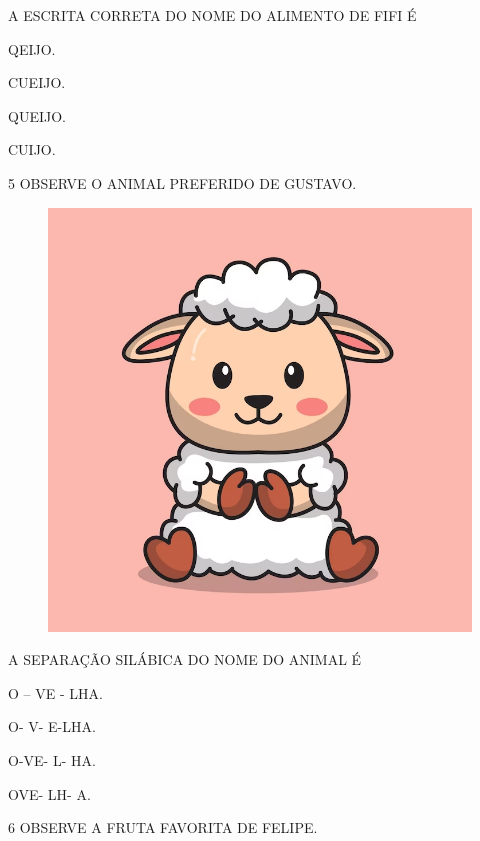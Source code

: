 A ESCRITA CORRETA DO NOME DO ALIMENTO DE FIFI É

\begin{multicols}{2}
\begin{escolha}

\item QEIJO.

\item CUEIJO.

\item QUEIJO.

\item CUIJO.
\end{escolha}
\end{multicols}

\num{5} OBSERVE O ANIMAL PREFERIDO DE GUSTAVO.

\begin{figure}[H]
\centering
\includegraphics[width=.5\textwidth]{./media/image214.png}
\end{figure}

A SEPARAÇÃO SILÁBICA DO NOME DO ANIMAL É

\begin{escolha}

\item O – VE - LHA.

\item O- V- E-LHA.

\item O-VE- L- HA.

\item OVE- LH- A.

\end{escolha}

\num{6} OBSERVE A FRUTA FAVORITA DE FELIPE.

